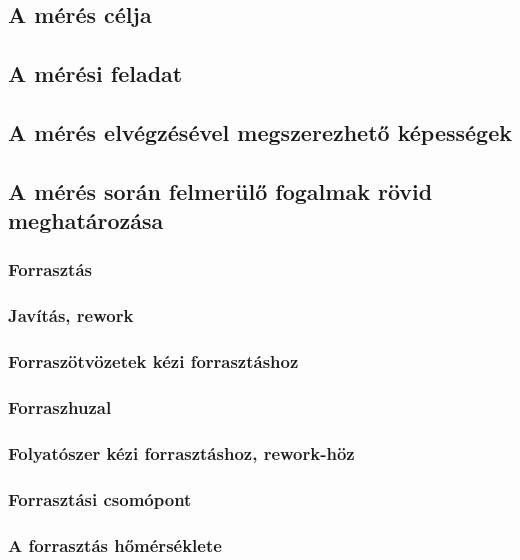\documentclass[../labor.tex]{subfiles}
\begin{document}
    \subsection{A mérés célja}
		
    \subsection{A mérési feladat}

    \subsection{A mérés elvégzésével megszerezhető képességek}

    \subsection{A mérés során felmerülő fogalmak rövid meghatározása}

        \subsubsection{Forrasztás}

        \subsubsection{Javítás, rework}

        \subsubsection{Forraszötvözetek kézi forrasztáshoz}

        \subsubsection{Forraszhuzal}

        \subsubsection{Folyatószer kézi forrasztáshoz, rework-höz}

        \subsubsection{Forrasztási csomópont}

        \subsubsection{A forrasztás hőmérséklete}
\end{document}
